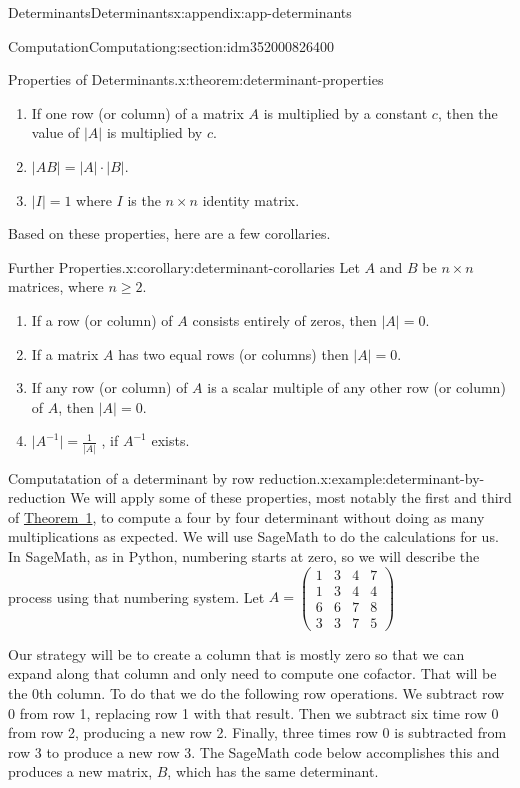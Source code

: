 \documentclass[oneside,10pt,]{book}
\begin{document}
\begin{appendixptx}{Determinants}{}{Determinants}{}{}{x:appendix:app-determinants}
\begin{sectionptx}{Computation}{}{Computation}{}{}{g:section:idm352000826400}
\begin{theorem}{Properties of Determinants.}{}{x:theorem:determinant-properties}
\begin{enumerate}
\item{}If one row (or column) of a matrix \(A\) is multiplied by a constant \(c\), then the value of \(\lvert A \rvert\) is multiplied by \(c\).%
\item{}\(\lvert A B \rvert = \lvert A \rvert \cdot \lvert B \rvert\).%
\item{}\(\lvert I \rvert  = 1\) where \(I\) is the \(n \times n\) identity matrix.%
\end{enumerate}
%
\end{theorem}
Based on these properties, here are a few corollaries.%
\begin{corollary}{Further Properties.}{}{x:corollary:determinant-corollaries}%
Let \(A\)  and \(B\) be \(n \times n\) matrices, where \(n \geq 2\).%
\begin{enumerate}
\item{}If a row (or column) of \(A\) consists entirely of zeros, then \(\lvert A \rvert = 0\).%
\item{}If a matrix \(A\) has two equal rows (or columns) then \(\lvert A \rvert = 0\).%
\item{}If any row (or column) of \(A\) is a scalar multiple of any other row (or column) of \(A\), then \(\lvert A \rvert = 0\).%
\item{}\(\lvert A^{-1} \rvert =\frac{1}{\lvert A \rvert}\) , if \(A^{-1}\) exists.%
\end{enumerate}
%
\end{corollary}
\begin{example}{Computatation of a determinant by row reduction.}{x:example:determinant-by-reduction}%
We will apply some of these properties, most notably the first and third of \hyperref[x:theorem:determinant-properties]{Theorem~1}, to compute a four by four determinant without doing as many multiplications as expected.  We will use SageMath to do the calculations for us.  In SageMath, as in Python, numbering starts at zero, so we will describe the process using that numbering system.  Let \(A=\begin{pmatrix}1 & 3 & 4 & 7\\
1 & 3 & 4 & 4\\
6 & 6 & 7 & 8\\
3 & 3 & 7 & 5
\end{pmatrix}\)%
\par
Our strategy will be to create a column that is mostly zero so that we can expand along that column and only need to compute one cofactor.  That will be the 0th column.  To do that we do the following row operations.  We subtract row 0 from row 1, replacing row 1 with that result.  Then we subtract six time row 0 from row 2, producing a new row 2.  Finally, three times row 0 is subtracted from row 3 to produce a new row 3.  The SageMath code below accomplishes this and produces a new matrix, \(B\), which has the same determinant.%

\end{example}
\end{sectionptx}
\end{appendixptx}
\end{document}
